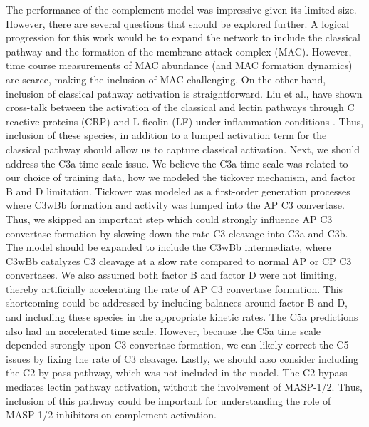 \documentclass[12pt]{article}
\begin{document}
The performance of the complement model was impressive given its limited size.
However, there are several questions that should be explored further.
A logical progression for this work would be to expand the network to include the classical pathway and the formation of the membrane attack complex (MAC).
However, time course measurements of MAC abundance (and MAC formation dynamics) are scarce, making the inclusion of MAC challenging.
On the other hand, inclusion of classical pathway activation is straightforward.
Liu et al., have shown cross-talk between the activation of the classical and lectin pathways through C reactive proteins (CRP) and L-ficolin (LF) under inflammation conditions \cite{liu2011computational}. Thus, inclusion of these species, in addition to a lumped activation term for the classical pathway should allow us to capture classical activation.
Next, we should address the C3a time scale issue.
We believe the C3a time scale was related to our choice of training data, how we modeled the tickover mechanism, and factor B and D limitation.
Tickover was modeled as a first-order generation processes where C3wBb formation and activity was lumped into the AP C3 convertase.
Thus, we skipped an important step which could strongly influence AP C3 convertase formation by slowing down the rate C3 cleavage into C3a and C3b.
The model should be expanded to include the C3wBb intermediate, where C3wBb catalyzes C3 cleavage at a slow rate compared to normal AP or CP C3 convertases.
We also assumed both factor B and factor D were not limiting, thereby artificially accelerating the rate of AP C3 convertase formation.
This shortcoming could be addressed by including balances around factor B and D, and including these species in the appropriate kinetic rates.
The C5a predictions also had an accelerated time scale.
However, because the C5a time scale depended strongly upon C3 convertase formation, we can likely correct the C5 issues by fixing the rate of C3 cleavage.
Lastly, we should also consider including the C2-by pass pathway, which was not included in the model.
The C2-bypass mediates lectin pathway activation, without the involvement of MASP-1/2.
Thus, inclusion of this pathway could be important for understanding the role of MASP-1/2 inhibitors on complement activation.
\end{document}
